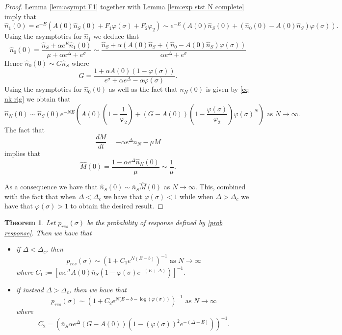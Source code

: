 \documentclass{article}
\numberwithin{equation}{section}
\theoremstyle{plain}
\newtheorem{theorem}{Theorem}[section]
\begin{document}
\begin{proof}
 
Lemma \ref{lem:asympt F1} together with Lemma \ref{lem:exp stst N complete} imply that
\[
\hat{n}_1 (0) =e^{-E } ( A(0) \hat{n}_S (0)+ F_1 \varphi(\sigma) + F_2 \varphi_2) \sim  e^{-E } ( A(0) \hat{n}_S (0) + (\hat{n}_0(0)  - A(0) \hat{n}_S )\varphi(\sigma) ). 
\]
Using the asymptotics for $\hat{n}_1 $ we deduce that 
\[
\hat{n}_0 (0)= \frac{\hat{n}_S + \alpha e^E \hat{n}_1(0)}{\mu + \alpha e^\Delta + e^\sigma } \sim \frac{\hat{n}_S + \alpha ( A(0) \hat{n}_S + (\hat{n}_0 - A(0) \hat{n}_S )\varphi(\sigma) ) }{ \alpha e^\Delta + e^\sigma } 
\]
Hence $\hat{n}_0(0) \sim G \hat{n}_S $ where 
\begin{equation} \label{G} 
G= \frac{1+ \alpha A(0) (1- \varphi(\sigma) )}{ e^\sigma + \alpha e^\Delta - \alpha \varphi(\sigma)}. 
\end{equation}
Using the asymptotics for $\hat{n}_0(0) $ as well as the fact that $n_N (0) $ is given by \eqref{eq nk rig} we obtain that
\[
     \hat{n}_N (0) \sim \hat{n}_S (0) e^{- N E } \left( A(0) \left( 1- \frac{1}{\varphi_2 }\right) + (G- A(0) ) \left( 1- \frac{\varphi(\sigma ) }{ \varphi_2}\right) \varphi(\sigma)^N   \right) \text{ as } N \to \infty. 
\] 
The fact that 
\[
\frac{dM}{dt } =- \alpha e^\Delta n_{N}  - \mu M 
\]
implies that 
\begin{equation*} 
\hat{M}(0) =\frac{ 1 - \alpha e^\Delta \hat{n}_{N}(0)}{\mu } \sim \frac{1}{\mu}. 
\end{equation*}

As a consequence we have that $\hat{n}_S(0) \sim \overline n_S \hat{M}(0) $ as $N \to \infty $. 
This, combined with the fact that when $\Delta < \Delta_c $ we have that $\varphi(\sigma) < 1 $ while when $\Delta > \Delta_c $ we have that $\varphi(\sigma ) > 1 $ to obtain the desired result. 
\end{proof} 
\begin{theorem} \label{thm: rigorous discr}
    Let $p_{res} (\sigma) $ be the probability of response defined by \eqref{prob response}. 
    Then  we have that 
    \begin{itemize}
        \item if $\Delta < \Delta_c $, then 
        \[
        p_{res}(\sigma ) \sim \left(  1 + C_1 e^{N(E- b)} \right)^{-1}   \text{ as } N \to \infty
        \]
        where $C_1:=\left[ \alpha e^{\Delta} A(0) \overline n_S \left(1- \varphi(\sigma) e^{-(E + \Delta)} \right) \right]^{-1}$. 
        \item if instead $\Delta > \Delta_c $, then we have that
        \[
        p_{res} (\sigma )   \sim \left(  1 + C_2 e^{N(E- b - \log(\varphi(\sigma))} \right)^{-1}   \text{ as } N \to \infty
        \]
where 
\[
C_2=  \left(\overline{n}_S  \alpha e^\Delta  (G- A(0) ) \left( 1-(\varphi(\sigma ))^2 e^{- (\Delta + E)}\right) \right)^{-1} . 
        \]
    \end{itemize}
\end{theorem}
\end{document}
